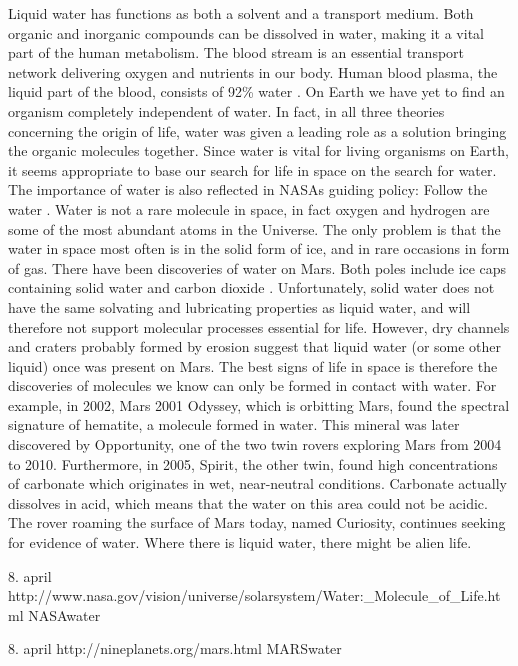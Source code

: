 Liquid water has functions as both a solvent and a transport medium.
Both organic and inorganic compounds can be dissolved in water, making it a vital part of the human metabolism.
The blood stream is an essential transport network delivering oxygen and nutrients in our body.
Human blood plasma, the liquid part of the blood, consists of 92\% water \cite{Blood}.
On Earth we have yet to find an organism completely independent of water. 
In fact, in all three theories concerning the origin of life, water was given a leading role as a solution bringing the organic molecules together. 
Since water is vital for living organisms on Earth, it seems appropriate to base our search for life in space on the search for water.
The importance of water is also reflected in NASAs guiding policy: Follow the water \cite{NASAwater}. 
Water is not a rare molecule in space, in fact oxygen and hydrogen are some of the most abundant atoms in the Universe.
The only problem is that the water in space most often is in the solid form of ice, and in rare occasions in form of gas.
There have been discoveries of water on Mars. 
Both poles include ice caps containing solid water and carbon dioxide \cite{MARSwater}. 
Unfortunately, solid water does not have the same solvating and lubricating properties as liquid water, and will therefore not support molecular processes essential for life.
However, dry channels and craters probably formed by erosion suggest that liquid water (or some other liquid) once was present on Mars.
The best signs of life in space is therefore the discoveries of molecules we know can only be formed in contact with water.
For example, in 2002, Mars 2001 Odyssey, which is orbitting Mars, found the spectral signature of hematite, a molecule formed in water. 
This mineral was later discovered by Opportunity, one of the two twin rovers exploring Mars from 2004 to 2010.
Furthermore, in 2005, Spirit, the other twin, found high concentrations of carbonate which originates in wet, near-neutral conditions. 
Carbonate actually dissolves in acid, which means that the water on this area could not be acidic.
The rover roaming the surface of Mars today, named Curiosity, continues seeking for evidence of water. 
Where there is liquid water, there might be alien life. 

8. april http://www.nasa.gov/vision/universe/solarsystem/Water:_Molecule_of_Life.html NASAwater

8. april http://nineplanets.org/mars.html MARSwater